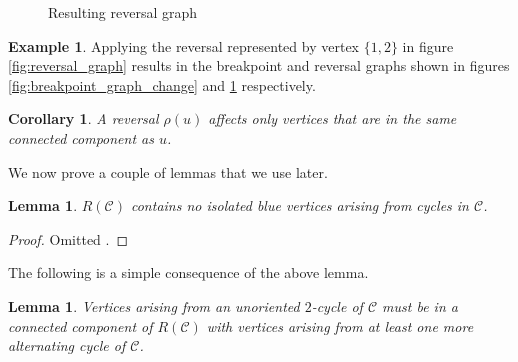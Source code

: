 \documentclass[11pt,DIV=11]{scrartcl}
\newtheorem{corollary}{Corollary}[theorem]
\newtheorem{lemma}[theorem]{Lemma}
\theoremstyle{definition}
\newtheorem{example}{Example}[theorem]
\theoremstyle{remark}
\begin{document}
\begin{figure}
    \centering
    \caption{Resulting reversal graph}
    \label{fig:reversal_graph_change}
\end{figure}

\begin{example}
Applying the reversal represented by vertex $\{1,2\}$ in figure \ref{fig:reversal_graph} results in the breakpoint and reversal graphs shown in figures \ref{fig:breakpoint_graph_change} and \ref{fig:reversal_graph_change} respectively.
\end{example}

\begin{corollary}
A reversal $\rho(u)$ affects only vertices that are in the same connected component as $u$.
\end{corollary}

We now prove a couple of lemmas that we use later.

\begin{lemma}
\label{lem:4}
$R(\mathcal{C})$ contains no isolated blue vertices arising from cycles in $\mathcal{C}$.
\end{lemma}

\begin{proof}
Omitted \cite{Christie1998}.
\end{proof}

The following is a simple consequence of the above lemma.

\begin{lemma}
\label{lem:5}
Vertices arising from an unoriented $2$-cycle of $\mathcal{C}$ must be in a connected component of $R(\mathcal{C})$ with vertices arising from at least one more alternating cycle of $\mathcal{C}$.
\end{lemma}
\end{document}

